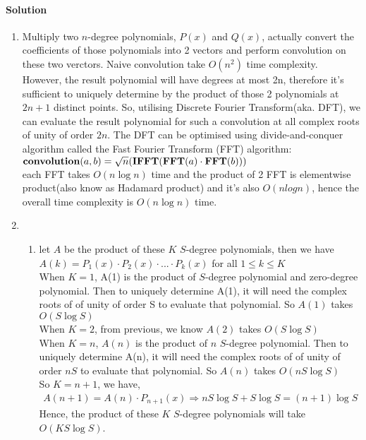 \documentclass[a4paper]{scrartcl}
\newcommand{\CON}{\pPkey{convolution}}
\newcommand{\FFT}{\pPkey{FFT}}
\newcommand{\IFFT}{\pPkey{IFFT}}
\begin{document}
\paragraph{Solution}
\begin{enumerate}[label=(\alph*)]
\item Multiply two $n$-degree polynomials, $P(x)$ and $Q(x)$, actually convert the coefficients of those polynomials into 2 vectors and perform convolution on these two verctors. Naive convolution take $O(n^2)$ time complexity.\\
However, the result polynomial will have degrees at most 2n, therefore it's sufficient to uniquely determine by the product of those 2 polynomials at $2n+1$ distinct points. So, utilising Discrete Fourier Transform(aka. DFT), we can evaluate the result polynomial for such a convolution at all complex roots of unity of order $2n$. The DFT can be optimised using divide-and-conquer algorithm called the Fast Fourier Transform (FFT) algorithm:\\
$ \CON(a,b) = \sqrt{n}(\IFFT(\FFT(a) \cdot \FFT(b)))$\\
each FFT takes $O(n\log{n})$ time and the product of 2 FFT is elementwise product(also know as Hadamard product) and it's also $O(nlogn)$, hence the overall time complexity is $O(n\log{n})$ time.
\pagebreak
\item\begin{enumerate}[label=(\roman*)]
  \item let $A$ be the product of these $K$ $S$-degree polynomials, then we have $A(k)=P_1(x) \cdot P_2(x) \cdot ... \cdot P_k(x)$ for all $1 \leq k \leq K$\\
  When $K=1$, A(1) is the product of $S$-degree polynomial and zero-degree polynomial. Then to uniquely determine A(1), it will need the complex roots of of unity of order S to evaluate that polynomial. So $A(1)$ takes $O(S\log{S})$\\
  When $K=2$, from previous, we know $A(2)$ takes $O(S\log{S})$\\
  When $K=n$, $A(n)$ is the product of $n$ $S$-degree polynomial. Then to uniquely determine A(n), it will need the complex roots of of unity of order $nS$ to evaluate that polynomial. So $A(n)$ takes $O(nS\log{S})$\\
  So $K=n+1$, we have,
  \begin{align*}
    A(n+1) = A(n) \cdot P_{n+1}(x) \Rightarrow nS\log{S} + S\log{S} = (n+1)\log{S}
  \end{align*}
  Hence, the product of these $K$ $S$-degree polynomials will take $O(KS\log{S})$.\\

\end{enumerate}
\end{enumerate}
\end{document}
